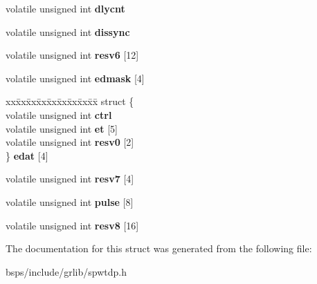 \begin{DoxyCompactItemize}
volatile unsigned int {\bfseries dlycnt}
\item 
\mbox{\label{structspwtdp__regs_ac166b4a8b76623a6e2ce049db3766211}} 
volatile unsigned int {\bfseries dissync}
\item 
\mbox{\label{structspwtdp__regs_a2da4e668d7f196f95583f9826eaa9d26}} 
volatile unsigned int {\bfseries resv6} \mbox{[}12\mbox{]}
\item 
\mbox{\label{structspwtdp__regs_a01e352a4b38233a195f7ac599d5b25d5}} 
volatile unsigned int {\bfseries edmask} \mbox{[}4\mbox{]}
\item 
\mbox{\label{structspwtdp__regs_a13c68021b85c596095f761d43842bd8d}} 
\begin{tabbing}
xx\=xx\=xx\=xx\=xx\=xx\=xx\=xx\=xx\=\kill
struct \{\\
\>volatile unsigned int {\bfseries ctrl}\\
\>volatile unsigned int {\bfseries et} \mbox{[}5\mbox{]}\\
\>volatile unsigned int {\bfseries resv0} \mbox{[}2\mbox{]}\\
\} {\bfseries edat} \mbox{[}4\mbox{]}\\

\end{tabbing}\item 
\mbox{\label{structspwtdp__regs_a7584f60356b71d619444f9e1ac0856b0}} 
volatile unsigned int {\bfseries resv7} \mbox{[}4\mbox{]}
\item 
\mbox{\label{structspwtdp__regs_afde1746698bc1527e11b56822eac846f}} 
volatile unsigned int {\bfseries pulse} \mbox{[}8\mbox{]}
\item 
\mbox{\label{structspwtdp__regs_a6f6fde0b41bc790b0c4ff21f609f270a}} 
volatile unsigned int {\bfseries resv8} \mbox{[}16\mbox{]}
\end{DoxyCompactItemize}


The documentation for this struct was generated from the following file\+:\begin{DoxyCompactItemize}
\item 
bsps/include/grlib/spwtdp.\+h\end{DoxyCompactItemize}
